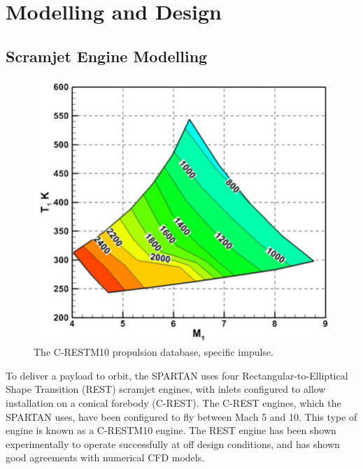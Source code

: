  





\section{Modelling and Design}



\subsection{Scramjet Engine Modelling}\label{sec:enginemodel}
\begin{figure}
	\centering
	\includegraphics[width=0.7\linewidth]{figures/2_literature-review/C-REST}
	\caption{The C-RESTM10 propulsion database, specific impulse.}
	\label{fig:C-REST}
\end{figure}
To deliver a payload to orbit, the SPARTAN uses four Rectangular-to-Elliptical Shape Transition (REST) scramjet engines, with inlets configured to allow installation on a conical forebody (C-REST). The C-REST engines, which the SPARTAN uses, have been configured to fly between Mach 5 and 10. This type of engine is known as a C-RESTM10 engine\cite{Preller2017b}. The REST engine has been shown experimentally to operate successfully at off design conditions\cite{Smart2006,Smart2009a}, and has shown good agreements with numerical CFD models\cite{Smart2009a}. 

